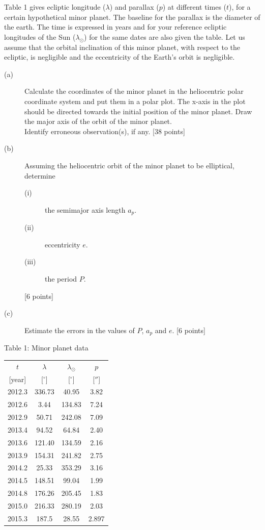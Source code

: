 Table 1 gives ecliptic longitude ($\lambda$) and parallax ($p$) at different
times ($t$), for a certain hypothetical minor planet. The baseline for the
parallax is the diameter of the earth. The time is expressed in years and for
your reference ecliptic longitudes of the Sun ($\lambda_\odot$) for the same
dates are also given the table. Let us assume that the orbital inclination of
this minor planet, with respect to the ecliptic, is negligible and the
eccentricity of the Earth's orbit is negligible.

\begin{description}
\item[(a)] Calculate the coordinates of the minor planet in the heliocentric
  polar coordinate system and put them in a polar plot. The x-axis in the plot
  should be directed towards the initial position of the minor planet. Draw
  the major axis of the orbit of the minor planet.\\
  Identify erroneous observation(s), if any. \hfill[38 points]
\item[(b)] Assuming the heliocentric orbit of the minor planet to be
  elliptical, determine
  \begin{description}
  \item[(i)] the semimajor axis length $a_p$.
  \item[(ii)] eccentricity $e$.
  \item[(iii)] the period $P$.
  \end{description}
  \hfill[6 points]
\item[(c)] Estimate the errors in the values of $P$, $a_p$ and $e$.
  \hfill[6 points]
\end{description}

\begin{center}
Table 1: Minor planet data

\begin{tabular}{cccc}
\hline
$t$ & $\lambda$ & $\lambda_\odot$ & $p$ \\
{[year]} & {[$^\circ$]} & {[$^\circ$]} & {[$''$]} \\
\hline
2012.3 & 336.73 & 40.95 & 3.82 \\
2012.6 & 3.44 & 134.83 & 7.24 \\
2012.9 & 50.71 & 242.08 & 7.09 \\
2013.4 & 94.52 & 64.84 & 2.40 \\
2013.6 & 121.40 & 134.59 & 2.16 \\
2013.9 & 154.31 & 241.82 & 2.75 \\
2014.2 & 25.33 & 353.29 & 3.16 \\
2014.5 & 148.51 & 99.04 & 1.99 \\
2014.8 & 176.26 & 205.45 & 1.83 \\
2015.0 & 216.33 & 280.19 & 2.03 \\
2015.3 & 187.5 & 28.55 & 2.897 \\
\hline
\end{tabular}
\end{center}
